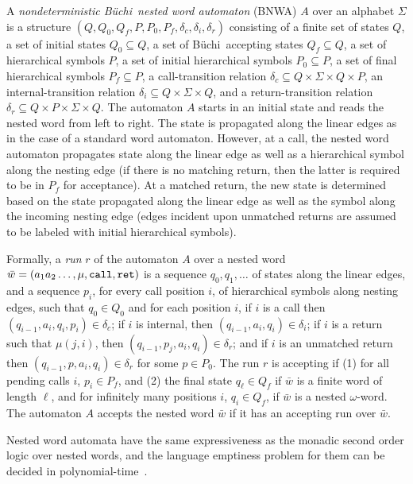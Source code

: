 \documentclass{LMCS}
\newcommand{\M}{{\mu}}
\newcommand{\w}{{\bar{w}}}
\theoremstyle{plain}
\theoremstyle{definition}
\newcommand{\retr}{\mathit{ret}}
\def\buchi{B\"{u}chi}
\def\cd{\delta_c}
\def\rd{\delta_r}
\def\id{\delta_i}
\newcommand{\rett}{{\tt ret}}
\newcommand{\call}{{\tt call}}
\renewcommand{\retr}{\rett}
\begin{document}
A {\em nondeterministic \buchi\ nested word automaton\/} (BNWA) $A$ 
over an alphabet $\Sigma$
is a structure $(Q, Q_0, Q_f, P, P_0, P_f, \cd, \id, \rd )$ consisting of
a finite set of states $Q$,
a set of initial states $Q_0\subseteq Q$,
a set of \buchi\ accepting states   $Q_f\subseteq Q$,
a set of hierarchical symbols $P$,
a set of initial hierarchical symbols $P_0\subseteq P$,
a set of final hierarchical symbols $P_f\subseteq P$,
a call-transition relation $\cd \subseteq Q \times \Sigma \times Q \times P $,
an  internal-transition relation $\id \subseteq Q \times \Sigma \times Q  $, 
and a return-transition relation $\rd \subseteq Q \times P \times \Sigma \times Q  $.
The automaton $A$ starts in an initial state and reads the nested word from left to
right. The state is propagated along the linear edges as in the case of
a standard word automaton.
However, at a call, the nested word automaton propagates state
along the linear edge as well as a hierarchical symbol 
along the nesting edge 
(if there is no matching return,
then the latter is required to be in  $P_f$ for acceptance). 
At a matched return, the new state is determined based on the
state propagated along the linear edge as well as the symbol along the
incoming
nesting edge (edges incident upon unmatched returns are assumed to be labeled with
initial hierarchical symbols).


Formally, a {\em run\/} $r$ of the automaton $A$ over a nested word
$\w=(a_1 a_2 \ldots , \M,\call,\retr)$ is a sequence $q_0, q_1, \ldots$ of
states along the linear edges,
and a sequence $p_i$, for every call position $i$, of hierarchical symbols 
along nesting edges,
such that $q_0\in Q_0$ and for each position $i$, if $i$ is a call 
then $(q_{i-1},a_i,q_i,p_i)\in\cd$; 
if $i$ is internal, then $(q_{i-1},a_i,q_i)\in\id$; if $i$ is a return such
that $\M(j, i)$, then $(q_{i-1}, p_j, a_i,q_i)\in\rd$;
and if $i$ is an unmatched return then $(q_{i-1},p,a_i,q_i)\in\rd$ for some $p\in P_0$.
The run $r$ is accepting if 
(1) for all pending calls $i$, $p_i\in P_f$, and 
(2) the final state $q_\ell\in Q_f$ if $\w$ is a finite word of length $\ell$, 
and for infinitely many positions $i$, $q_i\in Q_f$, if $\w$ is a nested $\omega$-word.  
The automaton $A$
accepts the nested word $\w$ if it has an accepting run over $\w$.

Nested word automata have the same expressiveness as 
the monadic second order logic over
nested words, and the language emptiness problem for them can be
decided in polynomial-time~\cite{nested}.
\end{document}
